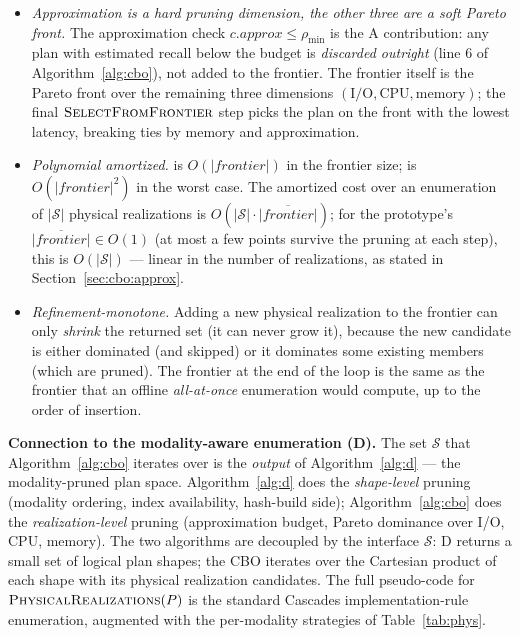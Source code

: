 \documentclass[sigconf,nonacm,review]{acmart}
\theoremstyle{plain}
\theoremstyle{definition}
\theoremstyle{remark}
\begin{document}
\begin{itemize}[leftmargin=*]
  \item \emph{Approximation is a \emph{hard} pruning
  dimension, the other three are a \emph{soft} Pareto
  front.} The approximation check
  $c.\mathit{approx} \le \rho_{\min}$ is the A contribution:
  any plan with estimated recall below the budget is
  \emph{discarded outright} (line 6 of Algorithm~\ref{alg:cbo}),
  not added to the frontier. The frontier itself is the
  Pareto front over the remaining three dimensions
  $(\mathrm{I/O}, \mathrm{CPU}, \mathrm{memory})$; the
  final $\Call{SelectFromFrontier}{}$ step picks the
  plan on the front with the lowest latency, breaking ties
  by memory and approximation.
  \item \emph{Polynomial amortized.}
   is $O(|\mathit{frontier}|)$ in
  the frontier size;  is
  $O(|\mathit{frontier}|^2)$ in the worst case. The
  amortized cost over an enumeration of
  $|\mathcal{S}|$ physical realizations is
  $O(|\mathcal{S}| \cdot \overline{|\mathit{frontier}|})$;
  for the prototype's
  $\overline{|\mathit{frontier}|} \in O(1)$ (at most a few
  points survive the pruning at each step), this is
  $O(|\mathcal{S}|)$ --- linear in the number of
  realizations, as stated in
  Section~\ref{sec:cbo:approx}.
  \item \emph{Refinement-monotone.} Adding a new
  physical realization to the frontier can only \emph{shrink}
  the returned set (it can never grow it), because the
  new candidate is either dominated (and skipped) or it
  dominates some existing members (which are pruned). The
  frontier at the end of the loop is the same as the
  frontier that an offline \emph{all-at-once}
  enumeration would compute, up to the order of
  insertion.
\end{itemize}

\noindent\textbf{Connection to the modality-aware
enumeration (D).} The set $\mathcal{S}$ that
Algorithm~\ref{alg:cbo} iterates over is the
\emph{output} of Algorithm~\ref{alg:d} --- the
modality-pruned plan space. Algorithm~\ref{alg:d} does the
\emph{shape-level} pruning (modality ordering, index
availability, hash-build side); Algorithm~\ref{alg:cbo}
does the \emph{realization-level} pruning (approximation
budget, Pareto dominance over I/O, CPU, memory). The two
algorithms are decoupled by the interface
$\mathcal{S}$: D returns a small set of logical plan
shapes; the CBO iterates over the Cartesian product of
each shape with its physical realization candidates. The
full pseudo-code for $\Call{PhysicalRealizations}{P}$ is
the standard Cascades implementation-rule enumeration,
augmented with the per-modality strategies of
Table~\ref{tab:phys}.
\end{document}
